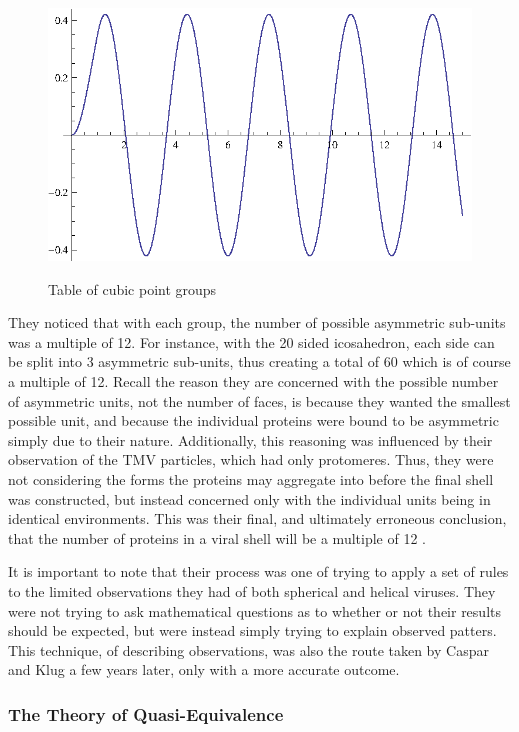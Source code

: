 \documentclass[12pt,letter]{article}
\begin{document}
\begin{figure}[h]
	\caption{Table of cubic point groups}
	\centering
	\includegraphics{place_holder.eps}
	\label{table:cubic_groups}
\end{figure}

They noticed that with each group, the number of possible asymmetric sub-units was a multiple of 12. For instance, with the 20 sided icosahedron, each side can be split into 3 asymmetric sub-units, thus creating a total of 60 which is of course a multiple of 12. Recall the reason they are concerned with the possible number of asymmetric units, not the number of faces, is because they wanted the smallest possible unit, and because the individual proteins were bound to be asymmetric simply due to their nature. Additionally, this reasoning was influenced by their observation of the TMV particles, which had only protomeres. Thus, they were not considering the forms the proteins may aggregate into before the final shell was constructed, but instead concerned only with the individual units being in identical environments. This was their final, and ultimately erroneous conclusion, that the number of proteins in a viral shell will be a multiple of 12 \cite[p 475]{Crick:1956}.

It is important to note that their process was one of trying to apply a set of rules to the limited observations they had of both spherical and helical viruses. They were not trying to ask mathematical questions as to whether or not their results should be expected, but were instead simply trying to explain observed patters. This technique, of describing observations, was also the route taken by Caspar and Klug a few years later, only with a more accurate outcome.

\subsubsection{The Theory of Quasi-Equivalence}
\end{document}
